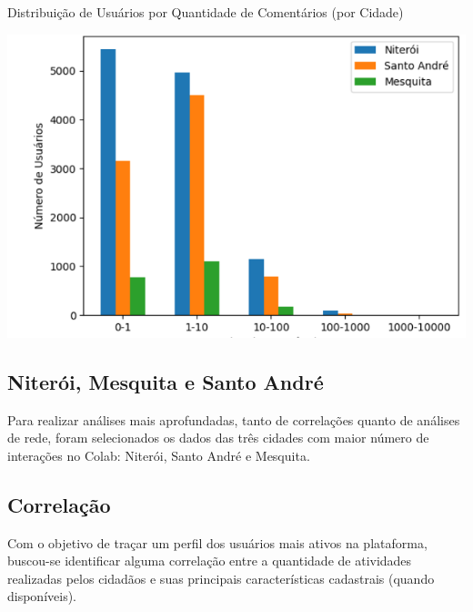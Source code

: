 \begin{quadro}[!htb]
	\caption{Distribuição de Usuários por Quantidade de Comentários (por Cidade)}
	\label{fig:colab_comments_by_city}
	\centering
	\includegraphics[scale=0.8]{images/colab_comments_by_city.png}
\end{quadro}

\subsection*{Niterói, Mesquita e Santo André}

Para realizar análises mais aprofundadas, tanto de correlações quanto de análises de rede, foram selecionados os dados das três cidades com maior número de interações no Colab: Niterói, Santo André e Mesquita.

\subsection*{Correlação}

Com o objetivo de traçar um perfil dos usuários mais ativos na plataforma, buscou-se identificar alguma correlação entre a quantidade de atividades realizadas pelos cidadãos e suas principais características cadastrais (quando disponíveis).


